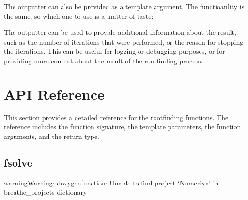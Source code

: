 \documentclass[letterpaper,10pt,english]{sphinxmanual}
\begin{document}
\sphinxAtStartPar
The outputter can also be provided as a template argument. The functioanlity is the same,  so which one to use is a matter of taste:

\begin{sphinxVerbatim}[commandchars=\\\{\}]
\PYG{p}{[}\PYG{p}{]}
\end{sphinxVerbatim}

\sphinxAtStartPar
The outputter can be used to provide additional information about the result, such as the number of iterations that were performed, or the reason for stopping the iterations. This can be useful for logging or debugging purposes, or for providing more context about the result of the root\sphinxhyphen{}finding process.


\section{API Reference}
\label{\detokenize{docRoots:api-reference}}
\sphinxAtStartPar
This section provides a detailed reference for the root\sphinxhyphen{}finding functions. The reference includes the function signature, the template parameters, the function arguments, and the return type.


\subsection{fsolve}
\label{\detokenize{docRoots:fsolve}}
\begin{sphinxadmonition}{warning}{Warning:}
\sphinxAtStartPar
doxygenfunction: Unable to find project ‘Numerixx’ in breathe\_projects dictionary
\end{sphinxadmonition}
\end{document}
